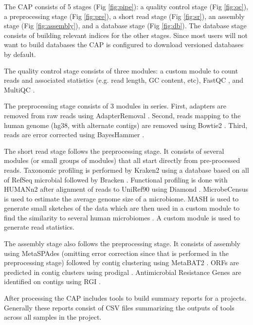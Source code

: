 The CAP consists of 5 stages (Fig \ref{fig:pipe}): a quality control stage (Fig \ref{fig:qc}), a preprocessing stage (Fig \ref{fig:pre}), a short read stage (Fig \ref{fig:sr}), an assembly stage (Fig \ref{fig:assembly}), and a database stage (Fig \ref{fig:db}). The database stage consists of building relevant indices for the other stages. Since most users will not want to build databases the CAP is configured to download versioned databases by default.

The quality control stage consists of three modules: a custom module to count reads and associated statistics (e.g. read length, GC content, etc), FastQC \citep{Andrews2010}, and MultiQC \citep{Ewels2016}.

The preprocessing stage consists of 3 modules in series. First, adapters are removed from raw reads using AdapterRemoval \citep{Schubert2016}. Second, reads mapping to the human genome (hg38, with alternate contigs) are removed using Bowtie2 \citep{LangmeadandStevenLSalzberg2013}. Third, reads are error corrected using BayesHammer \citep{Nikolenko2013}.

The short read stage follows the preprocessing stage. It consists of several modules (or small groups of modules) that all start directly from pre-processed reads. Taxonomic profiling is performed by Kraken2 \citep{Wood2019} using a database based on all of RefSeq microbial followed by Bracken \citep{Lu2017}. Functional profiling is done with HUMANn2 \citep{Franzosa2018} after alignment of reads to UniRef90 using Diamond \citep{Buchfink2014}. MicrobeCensus \citep{Nayfach2015} is used to estimate the average genome size of a microbiome. MASH is used to generate small sketches of the data which are then used in a custom module to find the similarity to several human microbiomes \citep{Consortium2012}. A custom module is used to generate read statistics.

The assembly stage also follows the preprocessing stage. It consists of assembly using MetaSPAdes (omitting error correction since that is performed in the preprocessing stage) \citep{Nurk2017} followed by contig clustering using MetaBAT2 \citep{Kang2019}. ORFs are predicted in contig clusters using prodigal \citep{Hyatt2010}. Antimicrobial Resistance Genes are identified on contigs using RGI \citep{Alcock2020}.

After processing the CAP includes tools to build summary reports for a projects. Generally these reports consist of CSV files summarizing the outputs of tools across all samples in the project.

